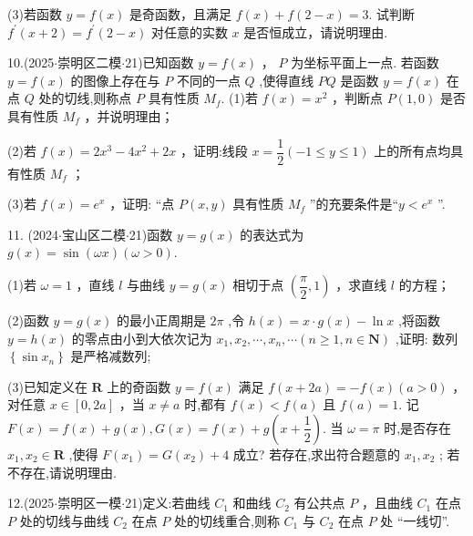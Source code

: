 (3)若函数 $y = f\left( x\right)$ 是奇函数，且满足 $f\left( x\right)  + f\left( {2 - x}\right)  = 3$. 试判断 ${f}^{\prime }\left( {x + 2}\right)  = {f}^{\prime }\left( {2 - x}\right)$ 对任意的实数 $x$ 是否恒成立，请说明理由.

10.(2025$\cdot$崇明区二模$\cdot$21)已知函数 $y = f\left( x\right)$ ， $P$ 为坐标平面上一点. 若函数 $y = f\left( x\right)$ 的图像上存在与 $P$ 不同的一点 $Q$ ,使得直线 ${PQ}$ 是函数 $y = f\left( x\right)$ 在点 $Q$ 处的切线,则称点 $P$ 具有性质 ${M}_{f}$. (1)若 $f\left( x\right)  = {x}^{2}$ ，判断点 $P\left( {1,0}\right)$ 是否具有性质 ${M}_{f}$ ，并说明理由；

(2)若 $f\left( x\right)  = 2{x}^{3} - 4{x}^{2} + {2x}$ ，证明:线段 $x = \dfrac{1}{2}\left( {-1 \leq  y \leq  1}\right)$ 上的所有点均具有性质 ${M}_{f}$ ；

(3)若 $f\left( x\right)  = {{e}}^{x}$ ，证明: “点 $P\left( {x,y}\right)$ 具有性质 ${M}_{f}$ ”的充要条件是“$y < {{e}}^{x}$ ”.

11. (2024$\cdot$宝山区二模$\cdot$21)函数 $y = g\left( x\right)$ 的表达式为 $g\left( x\right)  = \sin \left( {\omega x}\right) \left( {\omega  > 0}\right)$.

(1)若 $\omega  = 1$ ，直线 $l$ 与曲线 $y = g\left( x\right)$ 相切于点 $\left( {\dfrac{\pi }{2},1}\right)$ ，求直线 $l$ 的方程；

(2)函数 $y = g\left( x\right)$ 的最小正周期是 ${2\pi }$ ,令 $h\left( x\right)  = x \cdot  g\left( x\right)  - \ln x$ ,将函数 $y = h\left( x\right)$ 的零点由小到大依次记为 ${x}_{1},{x}_{2},\cdots ,{x}_{n},\cdots \left( {n \geq  1,n \in  \mathbf{N}}\right)$ ,证明: 数列 $\left\{  {\sin {x}_{n}}\right\}$ 是严格减数列;

(3)已知定义在 $\mathbf{R}$ 上的奇函数 $y = f\left( x\right)$ 满足 $f\left( {x + {2a}}\right)  =  - f\left( x\right) \left( {a > 0}\right)$ ，对任意 $x \in  \left\lbrack  {0,{2a}}\right\rbrack$ ，当 $x \neq  a$ 时,都有 $f\left( x\right)  < f\left( a\right)$ 且 $f\left( a\right)  = 1$. 记 $F\left( x\right)  = f\left( x\right)  + g\left( x\right) ,G\left( x\right)  = f\left( x\right)  +  g\left( {x + \dfrac{1}{2}}\right)$. 当 $\omega  = \pi$ 时,是否存在 ${x}_{1},{x}_{2} \in  \mathbf{R}$ ,使得 $F\left( {x}_{1}\right)  = G\left( {x}_{2}\right)  + 4$ 成立? 若存在,求出符合题意的 ${x}_{1},{x}_{2}$ ; 若不存在,请说明理由.

12.(2025$\cdot$崇明区一模$\cdot$21)定义:若曲线 ${C}_{1}$ 和曲线 ${C}_{2}$ 有公共点 $P$ ，且曲线 ${C}_{1}$ 在点 $P$ 处的切线与曲线 ${C}_{2}$ 在点 $P$ 处的切线重合,则称 ${C}_{1}$ 与 ${C}_{2}$ 在点 $P$ 处 “一线切”.

